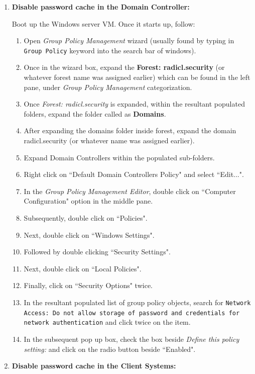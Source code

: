 \documentclass[12pt]{extarticle}
\begin{document}
\begin{enumerate}
	\item \textbf{Disable password cache in the Domain Controller:}
	
	\noindent
	Boot up the Windows server VM. Once it starts up, follow:
	
	\begin{enumerate}
		\item Open \textit{Group Policy Management} wizard (usually found by typing in \texttt{Group Policy} keyword into the search bar of windows).
		\item Once in the wizard box, expand the \textbf{Forest: radicl.security} (or whatever forest name was assigned earlier) which can be found in the left pane, under \textit{Group Policy Management} categorization.
		\item Once \textit{Forest: radicl.security} is expanded, within the resultant populated folders, expand the folder called as \textbf{Domains}.
		\item After expanding the domains folder inside forest, expand the domain radicl.security (or whatever name was assigned earlier).
		\item Expand Domain Controllers within the populated sub-folders.
		\item Right click on ``Default Domain Controllers Policy" and select ``Edit...".
		\item In the \textit{Group Policy Management Editor}, double click on ``Computer Configuration" option in the middle pane.
		\item Subsequently, double click on ``Policies".
		\item Next, double click on ``Windows Settings".
		\item Followed by double clicking ``Security Settings".
		\item Next, double click on ``Local Policies".
		\item Finally, click on ``Security Options" twice.
		\item In the resultant populated list of group policy objects, search for \texttt{Network Access: Do not allow storage of password and credentials for network authentication} and click twice on the item.
		\item In the subsequent pop up box, check the box beside \textit{Define this policy setting:} and click on the radio button beside ``Enabled". 
	\end{enumerate}

	\item \textbf{Disable password cache in the Client Systems:}
		

\end{enumerate}
\end{document}
